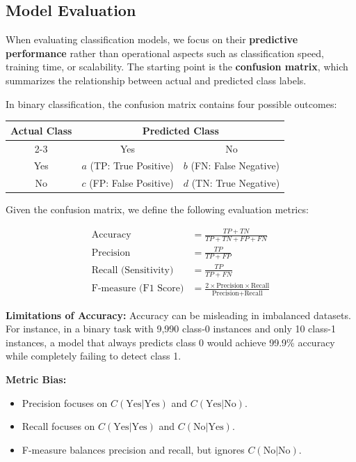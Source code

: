\subsection{Model Evaluation}

When evaluating classification models, we focus on their \textbf{predictive performance} rather than operational aspects such as classification speed, training time, or scalability. The starting point is the \textbf{confusion matrix}, which summarizes the relationship between actual and predicted class labels.

In binary classification, the confusion matrix contains four possible outcomes:

\begin{table}[h]
\centering
\begin{tabular}{|c|c|c|}
\hline
\multirow{2}{*}{\textbf{Actual Class}} & \multicolumn{2}{c|}{\textbf{Predicted Class}} \\
\cline{2-3}
& Yes & No \\
\hline
Yes & $a$ (TP: True Positive) & $b$ (FN: False Negative) \\
\hline
No & $c$ (FP: False Positive) & $d$ (TN: True Negative) \\
\hline
\end{tabular}
\end{table}

\begin{definition}
Given the confusion matrix, we define the following evaluation metrics:

\begin{align}
\text{Accuracy} &= \frac{TP + TN}{TP + TN + FP + FN} \\
\text{Precision} &= \frac{TP}{TP + FP} \\
\text{Recall (Sensitivity)} &= \frac{TP}{TP + FN} \\
\text{F-measure (F1 Score)} &= \frac{2 \times \text{Precision} \times \text{Recall}}{\text{Precision} + \text{Recall}}
\end{align}

\end{definition}

\textbf{Limitations of Accuracy:} Accuracy can be misleading in imbalanced datasets. For instance, in a binary task with 9,990 class-0 instances and only 10 class-1 instances, a model that always predicts class 0 would achieve 99.9\% accuracy while completely failing to detect class 1.

\textbf{Metric Bias:}
\begin{itemize}
    \item Precision focuses on $C(\text{Yes}|\text{Yes})$ and $C(\text{Yes}|\text{No})$.
    \item Recall focuses on $C(\text{Yes}|\text{Yes})$ and $C(\text{No}|\text{Yes})$.
    \item F-measure balances precision and recall, but ignores $C(\text{No}|\text{No})$.
\end{itemize}

